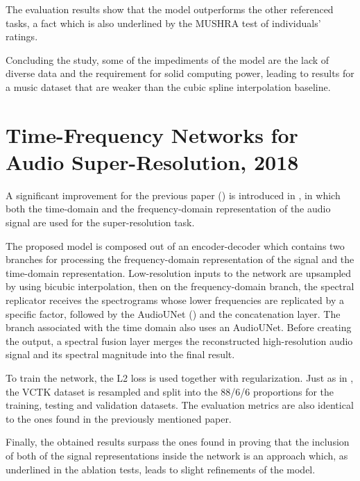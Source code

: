 \documentclass[conference]{IEEEtran}
\begin{document}
	The evaluation results show that the model outperforms the other referenced tasks, a fact which is also underlined by the MUSHRA test of individuals' ratings.

	Concluding the study, some of the impediments of the model are the lack of diverse data and the requirement for solid computing power, leading to results for a music dataset that are weaker than the cubic spline interpolation baseline.

\section{Time-Frequency Networks for Audio Super-Resolution, 2018}

	A significant improvement for the previous paper (\textcite{kuleshov2017audio}) is introduced in \textcite{timefrequencynetworks2018}, in which both the time-domain and the frequency-domain representation of the audio signal are used for the super-resolution task. 

	The proposed model is composed out of an encoder-decoder which contains two branches for processing the frequency-domain representation of the signal and the time-domain representation. 
	Low-resolution inputs to the network are upsampled by using bicubic interpolation, then on the frequency-domain branch, the spectral replicator receives the spectrograms whose lower frequencies are replicated by a specific factor, followed by the AudioUNet (\textcite{kuleshov2017audio}) and the concatenation layer. The branch associated with the time domain also uses an AudioUNet. Before creating the output, a spectral fusion layer merges the reconstructed high-resolution audio signal and its spectral magnitude into the final result.

	To train the network, the L2 loss is used together with regularization. Just as in \textcite{kuleshov2017audio}, the VCTK dataset is resampled and split into the 88/6/6 proportions for the training, testing and validation datasets. The evaluation metrics are also identical to the ones found in the previously mentioned paper.
	
	Finally, the obtained results surpass the ones found in \textcite{kuleshov2017audio} proving that the inclusion of both of the signal representations inside the network is an approach which, as underlined in the ablation tests, leads to slight refinements of the model.   
	
\printbibliography
\vspace{12pt}
\end{document}
